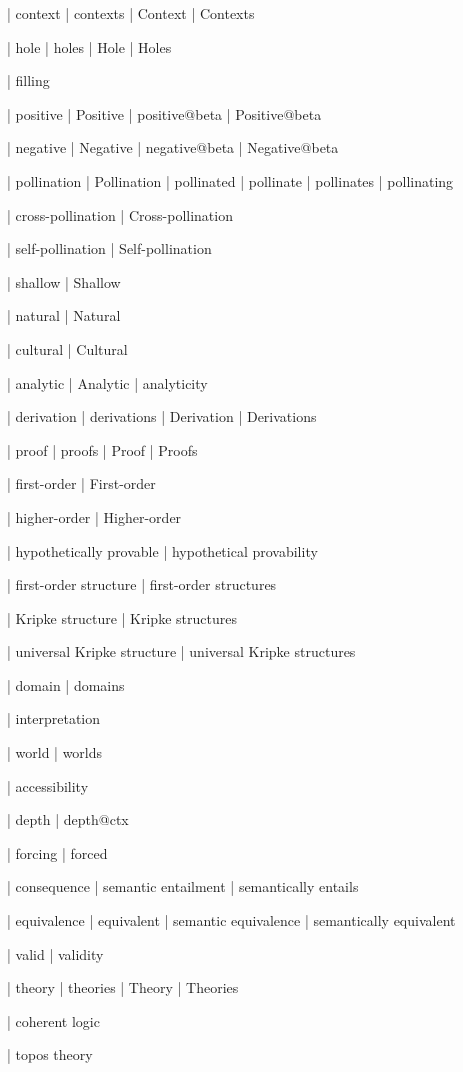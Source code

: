  | context
 | contexts
 | Context
 | Contexts

 | hole
 | holes
 | Hole
 | Holes

 | filling

 | positive
 | Positive
 | positive@beta
 | Positive@beta

 | negative
 | Negative
 | negative@beta
 | Negative@beta

 | pollination
 | Pollination
 | pollinated
 | pollinate
 | pollinates
 | pollinating

 | cross-pollination
 | Cross-pollination

 | self-pollination
 | Self-pollination

 | shallow
 | Shallow

 | natural
 | Natural

 | cultural
 | Cultural

 | analytic
 | Analytic
 | analyticity

 | derivation
 | derivations
 | Derivation
 | Derivations

 | proof
 | proofs
 | Proof
 | Proofs
 
 | first-order
 | First-order

 | higher-order
 | Higher-order

 | hypothetically provable
 | hypothetical provability

 | first-order structure
 | first-order structures

 | Kripke structure
 | Kripke structures

 | universal Kripke structure
 | universal Kripke structures

 | domain
 | domains

 | interpretation

 | world
 | worlds

 | accessibility

 | depth
 | depth@ctx

 | forcing
 | forced

 | consequence
 | semantic entailment
 | semantically entails

 | equivalence
 | equivalent
 | semantic equivalence
 | semantically equivalent

 | valid
 | validity

 | theory
 | theories
 | Theory
 | Theories

 | coherent logic

 | topos theory